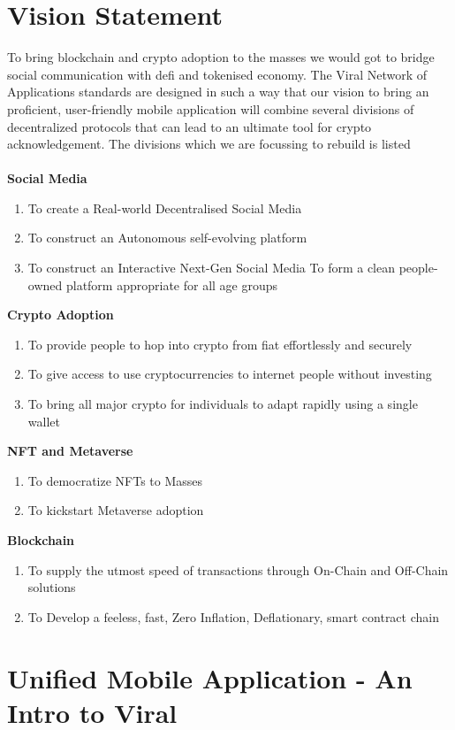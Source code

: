 \documentclass[10pt]{article}
\begin{document}
\section{Vision Statement}
To bring blockchain and crypto adoption to the masses we would got to bridge social communication with defi and tokenised economy. The Viral Network of Applications standards are designed in such a way that our vision to bring an proficient, user-friendly mobile application will combine several divisions of decentralized protocols that can lead to an ultimate tool for crypto acknowledgement. The divisions which we are focussing to rebuild is listed\\
\\
\textbf{\large Social Media}
\begin{enumerate}
\item To create a Real-world Decentralised Social Media
\item To construct an Autonomous self-evolving platform
\item To construct an Interactive Next-Gen Social Media
To form a clean people-owned platform appropriate for all age groups
\end{enumerate}
\textbf{\large Crypto Adoption}
\begin{enumerate}
\item To provide people to hop into crypto from fiat effortlessly and securely
\item To give access to use cryptocurrencies to internet people without investing
\item To bring all major crypto for individuals to adapt rapidly using a single wallet
\end{enumerate}
\textbf{\large NFT and Metaverse}
\begin{enumerate}
\item To democratize NFTs to Masses
\item To kickstart Metaverse adoption
\end{enumerate}
\textbf{\large Blockchain}
\begin{enumerate}
\item To supply the utmost speed of transactions through On-Chain and Off-Chain solutions
\item To Develop a feeless, fast, Zero Inflation, Deflationary, smart contract chain
\end{enumerate}

\newpage
\section{Unified Mobile Application - An Intro to Viral}
\end{document}
